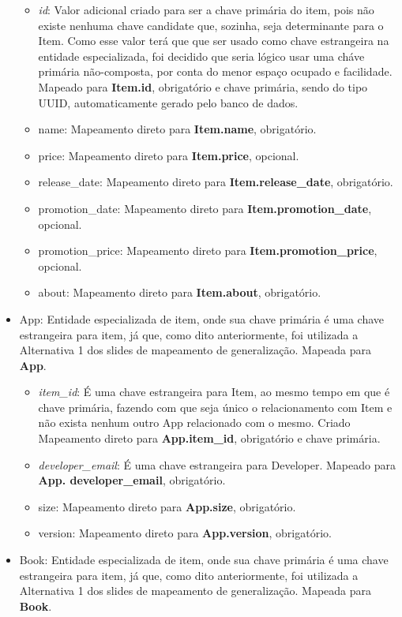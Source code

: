 \documentclass[a4paper, 11pt]{article}
\begin{document}
\begin{itemize}
    \begin{itemize}
        \item {\textit{id}}: Valor adicional criado para ser a chave primária do item, pois não existe nenhuma chave candidate que, sozinha, seja determinante para o Item. Como esse valor terá que que ser usado como chave estrangeira na entidade especializada, foi decidido que seria lógico usar uma cháve primária não-composta, por conta do menor espaço ocupado e facilidade. Mapeado para  {\textbf{Item.id}}, obrigatório e chave primária, sendo do tipo UUID, automaticamente gerado pelo banco de dados.
        \item name: Mapeamento direto para {\textbf{Item.name}}, obrigatório.
        \item price: Mapeamento direto para {\textbf{Item.price}}, opcional.
        \item release\_date: Mapeamento direto para {\textbf{Item.release\_date}}, obrigatório.
        \item promotion\_date: Mapeamento direto para {\textbf{Item.promotion\_date}}, opcional.
        \item promotion\_price: Mapeamento direto para {\textbf{Item.promotion\_price}}, opcional.
        \item about: Mapeamento direto para {\textbf{Item.about}}, obrigatório.
    \end{itemize}
    \item App: Entidade especializada de item, onde sua chave primária é uma chave estrangeira para item, já que, como dito anteriormente, foi utilizada a Alternativa 1 dos slides de mapeamento de generalização. Mapeada para {\textbf{App}}.
    \begin{itemize}
        \item {\textit{item\_id}}: É uma chave estrangeira para Item, ao mesmo tempo em que é chave primária, fazendo com que seja único o relacionamento com Item e não exista nenhum outro App relacionado com o mesmo. Criado Mapeamento direto para {\textbf{App.item\_id}}, obrigatório e chave primária.
        \item {\textit{developer\_email}}: É uma chave estrangeira para Developer. Mapeado para {\textbf{App. developer\_email}}, obrigatório.
        \item size: Mapeamento direto para {\textbf{App.size}}, obrigatório.
        \item version: Mapeamento direto para {\textbf{App.version}}, obrigatório.
    \end{itemize}
    \item Book: Entidade especializada de item, onde sua chave primária é uma chave estrangeira para item, já que, como dito anteriormente, foi utilizada a Alternativa 1 dos slides de mapeamento de generalização. Mapeada para {\textbf{Book}}.

\end{itemize}
\end{document}
